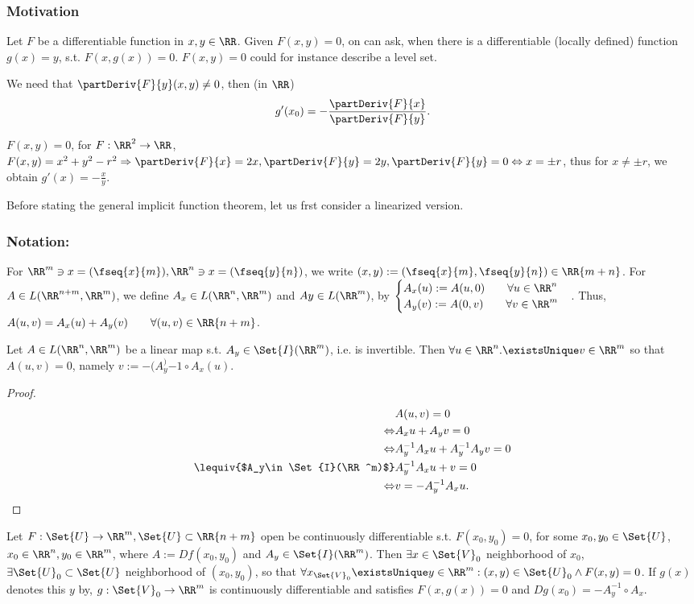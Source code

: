 \subsubsection*{Motivation}
Let $F$ be a differentiable function in $x, y\in\RR$. Given $F(x,y)=0$, on can ask, when there is a differentiable (locally defined) function $g(x)=y$, s.t. $F(x,g(x))=0$. $F(x,y)=0$ could for instance describe a level set. 

We need that $\partDeriv{F}{y}(x,y)\neq 0$, then (in $\RR$) $$g'(x_0)=-\frac{\partDeriv{F}{x}}{\partDeriv{F}{y}}.$$
\begin{exam}
  $F(x,y)=0$, for $F:\RR^2\to\RR$, $F(x,y)=x^2+y^2-r^2\Rightarrow \partDeriv{F}{x}=2x, \partDeriv{F}{y}=2y, \partDeriv{F}{y}=0\Leftrightarrow x=\pm r$, thus for $x\neq \pm r$, we obtain $g'(x)=-\frac{x}{y}$.
\end{exam}
Before stating the general implicit function theorem, let us frst consider a linearized version. 
\subsubsection*{Notation:}
For $\RR^m\ni x=(\fseq{x}{m}), \RR^n\ni x=(\fseq{y}{n})$, we write $(x,y):=(\fseq{x}{m},\fseq{y}{n})\in\RR{m+n}$. For $A\in L(\RR^{n+m},\RR^m)$, we define $A_x\in L(\RR^n, \RR^m)$ and $Ay\in L(\RR^m)$, by $\begin{cases}A_x(u):=A(u,0)\qquad\forall u\in\RR^n\\A_y(v):=A(0,v)\qquad\forall v\in\RR^m\end{cases}$. Thus, $A(u,v)=A_x(u)+A_y(v)\qquad\forall(u,v)\in\RR{n+m}$.

\begin{thm}
  Let $A\in L(\RR^n, \RR^m)$ be a linear map s.t. $A_y\in \Set{I}(\RR^m)$, i.e. is invertible. Then $\forall u\in\RR^n.\existsUnique v\in\RR^m$ so that $A(u,v)=0$, namely $v:=-(A_y^){-1}\circ A_x(u)$. 
\end{thm}
\begin{proof}
  \begin{align*}
  	&A(u,v)=0\\\Leftrightarrow &A_x u+A_y v=0\\\Leftrightarrow &A_y^{-1}A_xu+A_y^{-1}A_y v=0\\\lequiv{$A_y\in \Set{I}(\RR^m)$}&A_y^{-1}A_xu+v=0\\\Leftrightarrow &v=-A_y^{-1}A_x u.
  \end{align*}
\end{proof}

\begin{thm}
  \label{thm:impFun}
  Let $F:\Set{U}\to\RR^m, \Set{U}\subset \RR{n+m}$ open be continuously differentiable s.t. $F(x_0,y_0)=0$, for some $x_0, y_0\in\Set{U}$, $x_0\in\RR^n, y_0\in\RR^m$, where $A:=D f(x_0,y_0)$ and $A_y\in\Set{I}(\RR^m)$. Then $\exists x\in \Set{V}_0$ neighborhood of $x_0$, $\exists \Set{U}_0\subset \Set{U}$ neighborhood of $(x_0,y_0)$, so that $\forall x_{\Set{V}_0}\existsUnique y\in \RR^m:(x,y)\in\Set{U}_0\land F(x,y)=0$. If $g(x)$ denotes this $y$ by, $g:\Set{V}_0\to\RR^m$ is continuously differentiable and satisfies $F(x,g(x))=0$ and $Dg(x_0)=-A_y^{-1}\circ A_x$.  
\end{thm}
